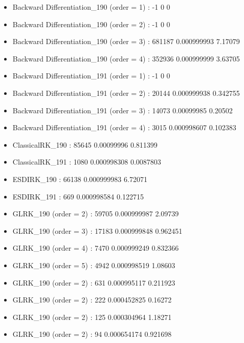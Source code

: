 \begin{itemize}
    \item Backward Differentiation\_190 (order = 1) : -1 0 0 
    \item Backward Differentiation\_190 (order = 2) : -1 0 0 
    \item Backward Differentiation\_190 (order = 3) : 681187 0.000999993 7.17079 
    \item Backward Differentiation\_190 (order = 4) : 352936 0.000999999 3.63705 
    \item Backward Differentiation\_191 (order = 1) : -1 0 0 
    \item Backward Differentiation\_191 (order = 2) : 20144 0.000999938 0.342755 
    \item Backward Differentiation\_191 (order = 3) : 14073 0.00099985 0.20502 
    \item Backward Differentiation\_191 (order = 4) : 3015 0.000998607 0.102383 
\end{itemize}

\begin{itemize}
    \item ClassicalRK\_190 : 85645 0.00099996 0.811399 
    \item ClassicalRK\_191 : 1080 0.000998308 0.0087803 
\end{itemize}

\begin{itemize}
    \item ESDIRK\_190 : 66138 0.000999983 6.72071 
    \item ESDIRK\_191 : 669 0.000998584 0.122715 
\end{itemize}

\begin{itemize}
    \item GLRK\_190 (order = 2) : 59705 0.000999987 2.09739 
    \item GLRK\_190 (order = 3) : 17183 0.000999848 0.962451 
    \item GLRK\_190 (order = 4) : 7470 0.000999249 0.832366 
    \item GLRK\_190 (order = 5) : 4942 0.000998519 1.08603 
    \item GLRK\_190 (order = 2) : 631 0.000995117 0.211923 
    \item GLRK\_190 (order = 2) : 222 0.000452825 0.16272 
    \item GLRK\_190 (order = 2) : 125 0.000304964 1.18271 
    \item GLRK\_190 (order = 2) : 94 0.000654174 0.921698 
\end{itemize}

